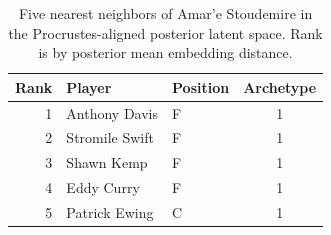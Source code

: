 \begin{table}[htbp]
  \centering\small
  \begin{tabular}{rllc}
    \toprule
    Rank & Player & Position & Archetype \\
    \midrule
    1 & Anthony Davis & F & 1 \\
    2 & Stromile Swift & F & 1 \\
    3 & Shawn Kemp & F & 1 \\
    4 & Eddy Curry & F & 1 \\
    5 & Patrick Ewing & C & 1 \\
    \bottomrule
  \end{tabular}
  \caption{Five nearest neighbors of Amar'e Stoudemire in the Procrustes-aligned posterior latent space. Rank is by posterior mean embedding distance.}
  \label{tab:Amar_e_Stoudemire_neighbors}
\end{table}

